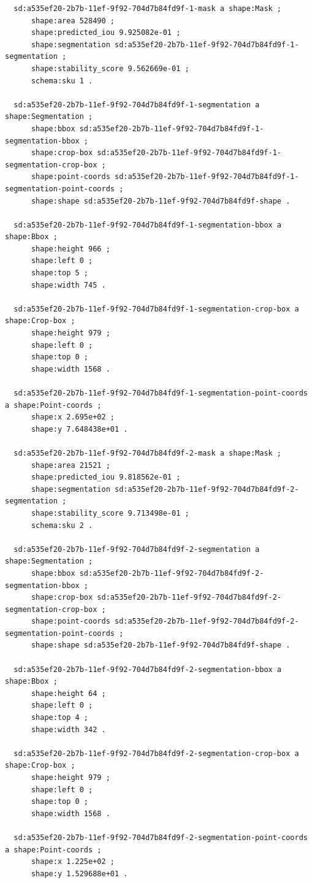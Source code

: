 \documentclass[732,fontsize=14pt,final]{studrep}
\begin{document}
\begin{verbatim}
  sd:a535ef20-2b7b-11ef-9f92-704d7b84fd9f-1-mask a shape:Mask ;
      shape:area 528490 ;
      shape:predicted_iou 9.925082e-01 ;
      shape:segmentation sd:a535ef20-2b7b-11ef-9f92-704d7b84fd9f-1-segmentation ;
      shape:stability_score 9.562669e-01 ;
      schema:sku 1 .
  
  sd:a535ef20-2b7b-11ef-9f92-704d7b84fd9f-1-segmentation a shape:Segmentation ;
      shape:bbox sd:a535ef20-2b7b-11ef-9f92-704d7b84fd9f-1-segmentation-bbox ;
      shape:crop-box sd:a535ef20-2b7b-11ef-9f92-704d7b84fd9f-1-segmentation-crop-box ;
      shape:point-coords sd:a535ef20-2b7b-11ef-9f92-704d7b84fd9f-1-segmentation-point-coords ;
      shape:shape sd:a535ef20-2b7b-11ef-9f92-704d7b84fd9f-shape .
  
  sd:a535ef20-2b7b-11ef-9f92-704d7b84fd9f-1-segmentation-bbox a shape:Bbox ;
      shape:height 966 ;
      shape:left 0 ;
      shape:top 5 ;
      shape:width 745 .
  
  sd:a535ef20-2b7b-11ef-9f92-704d7b84fd9f-1-segmentation-crop-box a shape:Crop-box ;
      shape:height 979 ;
      shape:left 0 ;
      shape:top 0 ;
      shape:width 1568 .
  
  sd:a535ef20-2b7b-11ef-9f92-704d7b84fd9f-1-segmentation-point-coords a shape:Point-coords ;
      shape:x 2.695e+02 ;
      shape:y 7.648438e+01 .
  
  sd:a535ef20-2b7b-11ef-9f92-704d7b84fd9f-2-mask a shape:Mask ;
      shape:area 21521 ;
      shape:predicted_iou 9.818562e-01 ;
      shape:segmentation sd:a535ef20-2b7b-11ef-9f92-704d7b84fd9f-2-segmentation ;
      shape:stability_score 9.713498e-01 ;
      schema:sku 2 .
  
  sd:a535ef20-2b7b-11ef-9f92-704d7b84fd9f-2-segmentation a shape:Segmentation ;
      shape:bbox sd:a535ef20-2b7b-11ef-9f92-704d7b84fd9f-2-segmentation-bbox ;
      shape:crop-box sd:a535ef20-2b7b-11ef-9f92-704d7b84fd9f-2-segmentation-crop-box ;
      shape:point-coords sd:a535ef20-2b7b-11ef-9f92-704d7b84fd9f-2-segmentation-point-coords ;
      shape:shape sd:a535ef20-2b7b-11ef-9f92-704d7b84fd9f-shape .
  
  sd:a535ef20-2b7b-11ef-9f92-704d7b84fd9f-2-segmentation-bbox a shape:Bbox ;
      shape:height 64 ;
      shape:left 0 ;
      shape:top 4 ;
      shape:width 342 .
  
  sd:a535ef20-2b7b-11ef-9f92-704d7b84fd9f-2-segmentation-crop-box a shape:Crop-box ;
      shape:height 979 ;
      shape:left 0 ;
      shape:top 0 ;
      shape:width 1568 .
  
  sd:a535ef20-2b7b-11ef-9f92-704d7b84fd9f-2-segmentation-point-coords a shape:Point-coords ;
      shape:x 1.225e+02 ;
      shape:y 1.529688e+01 .
  

\end{verbatim}
\end{document}
